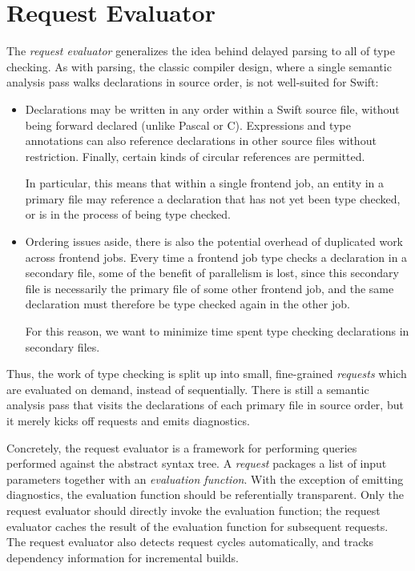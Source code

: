 \documentclass[../generics]{subfiles}
\begin{document}
\section{Request Evaluator}\label{request evaluator}

The \emph{request evaluator} generalizes the idea behind delayed parsing to all of type checking. As with parsing, the classic compiler design, where a single semantic analysis pass walks declarations in source order, is not well-suited for Swift:
\begin{itemize}
\item Declarations may be written in any order within a Swift source file, without being forward declared (unlike Pascal or C). Expressions and type annotations can also reference declarations in other source files without restriction. Finally, certain kinds of circular references are permitted.

In particular, this means that within a single frontend job, an entity in a primary file may reference a declaration that has not yet been type checked, or is in the process of being type checked.

\item Ordering issues aside, there is also the potential overhead of duplicated work across frontend jobs. Every time a frontend job type checks a declaration in a secondary file, some of the benefit of parallelism is lost, since this secondary file is necessarily the primary file of some other frontend job, and the same declaration must therefore be type checked again in the other job.

For this reason, we want to minimize time spent type checking declarations in secondary files.
\end{itemize}

Thus, the work of type checking is split up into small, fine-grained \emph{requests} which are evaluated on demand, instead of sequentially. There is still a semantic analysis pass that visits the declarations of each primary file in source order, but it merely kicks off requests and emits diagnostics.

Concretely, the request evaluator is a framework for performing queries performed against the abstract syntax tree. A \emph{request} packages a list of input parameters together with an \emph{evaluation function}. With the exception of emitting diagnostics, the evaluation function should be referentially transparent. Only the request evaluator should directly invoke the evaluation function; the request evaluator caches the result of the evaluation function for subsequent requests. The request evaluator also detects request cycles automatically, and tracks dependency information for incremental builds.
\end{document}
